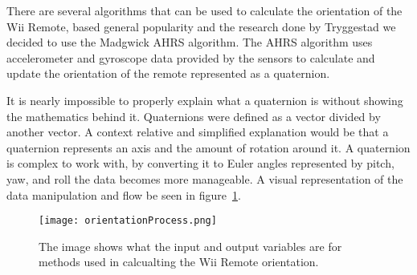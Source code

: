 
There are several algorithms that can be used to calculate the orientation of the Wii Remote, based general popularity and the research done by Tryggestad\cite{Tryggestad} we decided to use the Madgwick AHRS algorithm\cite{Madgwick}. The AHRS algorithm uses accelerometer and gyroscope data provided by the sensors to calculate and update the orientation of the remote represented as a quaternion. %

It is nearly impossible to properly explain what a quaternion is without showing the mathematics behind it. Quaternions were defined as a vector divided by another vector. A context relative and simplified explanation would be that a quaternion represents an axis and the amount of rotation around it. A quaternion is complex to work with, by converting it to Euler angles represented by pitch, yaw, and roll the data becomes more manageable. A visual representation of the data manipulation and flow be seen in figure~\ref{fig:orientationProcess}.

\begin{figure}[h!]
  \centering
    \texttt{[image: orientationProcess.png]}
    \caption{\footnotesize The image shows what the input and output variables are for methods used in calcualting the Wii Remote orientation.}
    \label{fig:orientationProcess}
\end{figure}


